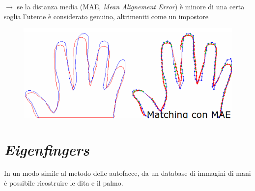 \documentclass{report}
\begin{document}
\begin{enumerate}
\begin{itemize}
        \noindent$\rightarrow$ se la distanza media (MAE, \textit{Mean Alignement Error}) è minore di una certa soglia 
        l'utente è considerato genuino, altrimeniti come un impostore
    \end{itemize}
    \begin{figure}[ht]
        \centering
        \includegraphics[width=1\linewidth]{images/matching.png}
    \end{figure}
\end{enumerate}

\newpage
\section{\textit{Eigenfingers}}
In un modo simile al metodo delle autofacce, da un database 
di immagini di mani è possibile ricostruire le dita e il palmo.
\end{document}
